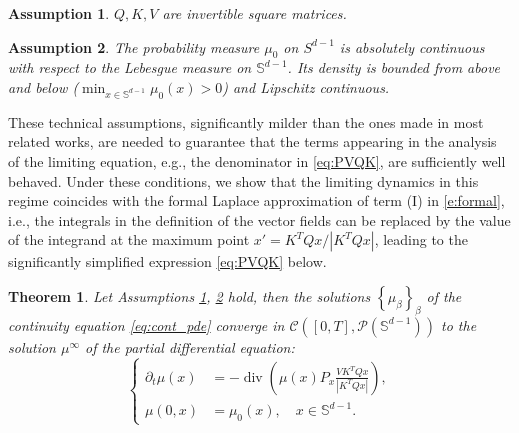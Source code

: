\documentclass{article}
\newtheorem{theorem}{Theorem}
\numberwithin{theorem}{section}
\newtheorem{assumption}{Assumption}
\DeclareMathOperator{\Div}{div}
\begin{document}
\begin{assumption}
\label{ass:QKV}
$Q,K,V$ are invertible square matrices.
\end{assumption}
\begin{assumption}
\label{ass:BL} The probability measure $\mu_0$ on $S^{d-1}$ is absolutely continuous with respect to the Lebesgue measure on $\mathbb{S}^{d-1}$. Its density is bounded from above and below ($\min_{x\in\mathbb{S}^{d-1}}\mu_0(x) > 0$) and Lipschitz continuous.
\end{assumption}

These technical assumptions, significantly milder than the ones made in most related works, are needed to guarantee that the terms appearing in the analysis of the limiting equation, e.g., the denominator in \eqref{eq:PVQK}, are sufficiently well behaved.  Under these conditions, we show that the limiting dynamics in this regime coincides with the formal Laplace approximation of term (I) in \eqref{e:formal}, i.e., the integrals in the definition of the vector fields can be replaced by the value of the integrand at the maximum point $x'={K^TQx}/{|K^TQx|}$, leading to the significantly simplified expression \eqref{eq:PVQK} below.
\begin{theorem}
\label{thm:squashing_phase}
Let Assumptions \ref{ass:QKV}, \ref{ass:BL} hold, then the solutions $\left\{\mu_\beta\right\}_\beta$ of the continuity equation \eqref{eq:cont_pde} converge in $\mathcal{C}([0,T], \mathcal{P}(\mathbb{S}^{d-1}))$ to the solution $\mu^\infty$ of the partial differential equation:
    \begin{equation}
    \label{eq:PVQK}
         \begin{cases}
    \partial_t \mu(x) &= - \Div\left(\mu(x) P_x\frac{VK^TQx}{|K^TQx|}\right), \\
    \mu(0,x) &= \mu_0(x), \quad x \in \mathbb{S}^{d-1}.
    \end{cases}
    \end{equation}
\end{theorem}
\end{document}
